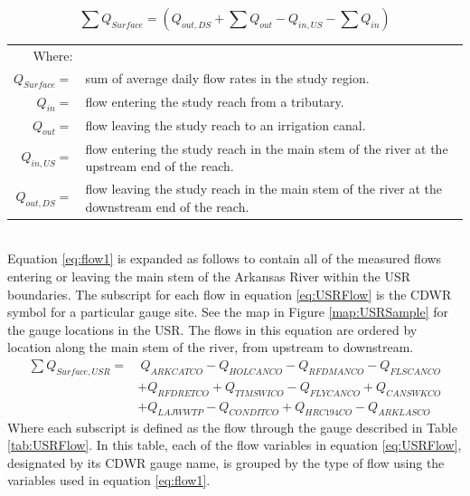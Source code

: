\begin{linenumbers}
\begin{equation}
\label{eq:flow1}
\sum Q_{Surface} = \left( Q_{out,DS} + \sum Q_{out} - Q_{in,US} - \sum Q_{in} \right) 
\end{equation}
\begin{tabular}{r p{5.5in}}
	Where: & \\
	$ Q_{Surface} = $ & sum of average daily flow rates in the study region.\\
	$ Q_{in} = $ & flow entering the study reach from a tributary.\\
	$ Q_{out} = $ & flow leaving the study reach to an irrigation canal.\\
	$ Q_{in,US} = $ & flow entering the study reach in the main stem of the river at the upstream end of the reach.\\
	$ Q_{out,DS} = $ & flow leaving the study reach in the main stem of the river at the downstream end of the reach.\\
\end{tabular}\\

Equation \ref{eq:flow1} is expanded as follows to contain all of the measured flows entering or leaving the main stem of the Arkansas River within the USR boundaries.  The subscript for each flow in equation \ref{eq:USRFlow} is the CDWR symbol for a particular gauge site.  See the map in Figure \ref{map:USRSample} for the gauge locations in the USR.  The flows in this equation are ordered by location along the main stem of the river, from upstream to downstream.
\begin{align}
	\label{eq:USRFlow}
	\sum Q_{Surface,USR} = &~Q_{ARKCATCO} - Q_{HOLCANCO} - Q_{RFDMANCO} - Q_{FLSCANCO} \\
	\nonumber & + Q_{RFDRETCO} + Q_{TIMSWICO} - Q_{FLYCANCO} + Q_{CANSWKCO} \\ 
	\nonumber & + Q_{LAJWWTP} - Q_{CONDITCO} + Q_{HRC194CO} - Q_{ARKLASCO}
\end{align}
Where each subscript is defined as the flow through the gauge described in Table \ref{tab:USRFlow}.  In this table, each of the flow variables in equation \ref{eq:USRFlow}, designated by its CDWR gauge name, is grouped by the type of flow using the variables used in equation \ref{eq:flow1}.


\end{linenumbers}
